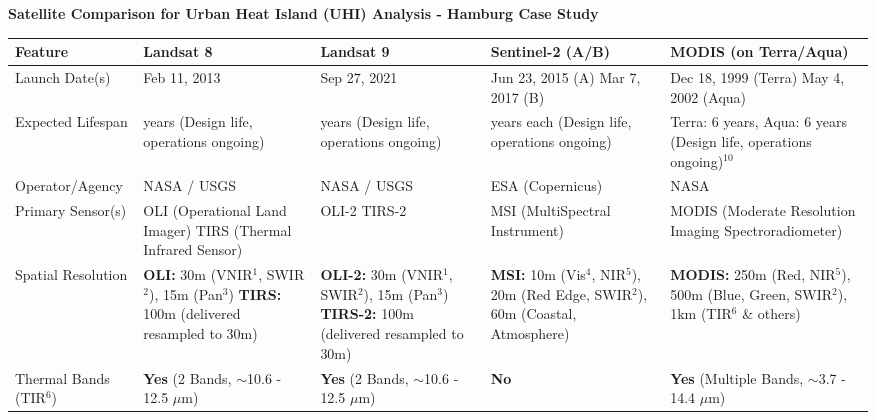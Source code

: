 \documentclass{article}
\begin{document}
\begin{minipage}{\textwidth} %
\noindent
\textbf{Satellite Comparison for Urban Heat Island (UHI) Analysis - Hamburg Case Study}

\medskip %

\noindent
{\small %
\begin{tabularx}{\textwidth}{| l | >{\RaggedRight\arraybackslash}X | >{\RaggedRight\arraybackslash}X | >{\RaggedRight\arraybackslash}X | >{\RaggedRight\arraybackslash}X |}
\hline
\textbf{Feature} & \textbf{Landsat 8} & \textbf{Landsat 9} & \textbf{Sentinel-2 (A/B)} & \textbf{MODIS (on Terra/Aqua)} \\
\hline
Launch Date(s) & Feb 11, 2013 & Sep 27, 2021 & Jun 23, 2015 (A) \newline Mar 7, 2017 (B) & Dec 18, 1999 (Terra) \newline May 4, 2002 (Aqua) \\
\hline
Expected Lifespan & 5 years (Design life, operations ongoing) & 5 years (Design life, operations ongoing) & 7.5 years each (Design life, operations ongoing) & Terra: 6 years, Aqua: 6 years (Design life, operations ongoing)$^{10}$ \\
\hline
Operator/Agency & NASA / USGS & NASA / USGS & ESA (Copernicus) & NASA \\
\hline
Primary Sensor(s) & OLI (Operational Land Imager) \newline TIRS (Thermal Infrared Sensor) & OLI-2 \newline TIRS-2 & MSI (MultiSpectral Instrument) & MODIS (Moderate Resolution Imaging Spectroradiometer) \\
\hline
Spatial Resolution & \textbf{OLI:} 30m (VNIR$^1$, SWIR$^2$), 15m (Pan$^3$) \newline \textbf{TIRS:} 100m (delivered resampled to 30m) & \textbf{OLI-2:} 30m (VNIR$^1$, SWIR$^2$), 15m (Pan$^3$) \newline \textbf{TIRS-2:} 100m (delivered resampled to 30m) & \textbf{MSI:} 10m (Vis$^4$, NIR$^5$), 20m (Red Edge, SWIR$^2$), 60m (Coastal, Atmosphere) & \textbf{MODIS:} 250m (Red, NIR$^5$), 500m (Blue, Green, SWIR$^2$), 1km (TIR$^6$ \& others) \\
\hline
Thermal Bands (TIR$^6$) & \textbf{Yes} (2 Bands, $\sim$10.6 - 12.5 $\mu$m) & \textbf{Yes} (2 Bands, $\sim$10.6 - 12.5 $\mu$m) & \textbf{No} & \textbf{Yes} (Multiple Bands, $\sim$3.7 - 14.4 $\mu$m) \\

\end{tabularx}}
\end{minipage}
\end{document}

